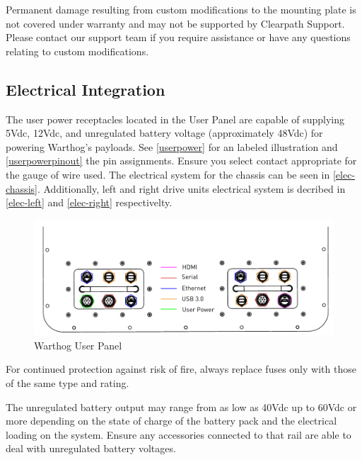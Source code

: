\documentclass[]{clearpath-latex/clearpath-manual}
\begin{document}
\begin{warning}[]
Permanent damage resulting from custom modifications to the mounting plate is not covered under warranty and may not be supported by Clearpath Support.  Please contact our support team if you require assistance or have any questions relating to custom modifications.
\end{warning}


\pagebreak[4]
\subsection{Electrical Integration}
\label{electrical}

The user power receptacles located in the User Panel are capable of supplying 5Vdc, 12Vdc, and unregulated battery voltage (approximately 48Vdc) for powering Warthog's payloads. See \autoref{userpower} for an labeled illustration and \autoref{userpowerpinout} the pin assignments. Ensure you select contact appropriate for the gauge of wire used.  The electrical system for the chassis can be seen in \autoref{elec-chassis}. Additionally, left and right drive units electrical system is decribed in \autoref{elec-left} and \autoref{elec-right} respectivelty.




\begin{figure}[!h]
  \centering
  \includegraphics[width=1.0\linewidth]{User_Panel_Labeled.pdf}
  \caption{Warthog User Panel}
  \label{userpower}
\end{figure}


\begin{warning}
For continued protection against risk of fire, always replace fuses only with those of the same type and rating.
\end{warning}

\begin{warning}
The unregulated battery output may range from as low as 40Vdc up to 60Vdc or more depending on the state of charge of the battery pack and the electrical loading on the system. Ensure any accessories connected to that rail are able to deal with unregulated battery voltages.
\end{warning}
\end{document}
